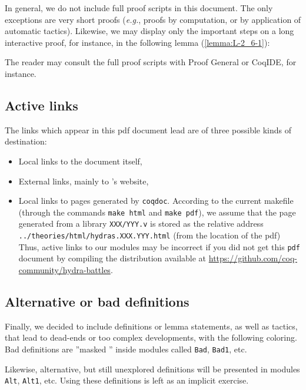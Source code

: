 \documentclass[twoside,a4paper]{book}
\newcounter{snippets}
\begin{document}
In general, we do not include full proof scripts in this document. The only exceptions are very short proofs (\emph{e.g.}, proofs by computation, or by application of automatic tactics). Likewise, we may display only the important steps on a long interactive proof, for instance, in the following lemma (\vref{lemma:L-2_6-1}):




The reader may consult the full proof scripts with Proof General or CoqIDE, for instance.

\subsection{Active links}
The  links which appear in this pdf  document lead are of three possible kinds of destination:
\begin{itemize}
\item Local links to the document itself,
\item External links, mainly to \coq's website,
\item Local links to pages generated by \texttt{coqdoc}. According to the current makefile (through the commands \texttt{make html} and \texttt{make pdf}), 
  we assume that the page generated from a library \texttt{XXX/YYY.v} is stored as
the relative address \texttt{../theories/html/hydras.XXX.YYY.html} (from the location of the pdf)
Thus,  active links to our \coq{} modules may be incorrect if you did not get this \texttt{pdf} document by compiling the distribution available at
\url{https://github.com/coq-community/hydra-battles}.

\end{itemize}

\subsection{Alternative or bad definitions}
\label{sect:alt-proofs}
Finally, we decided to include definitions or lemma statements, as well as tactics,  that lead to
dead-ends or too complex developments, with the following coloring.
Bad definitions 
 are ''masked '' inside modules called \texttt{Bad}, \texttt{Bad1}, etc.





Likewise, alternative, but still unexplored definitions will be presented in modules
\texttt{Alt}, \texttt{Alt1}, etc. Using these definitions is left as an implicit exercise.
\end{document}
